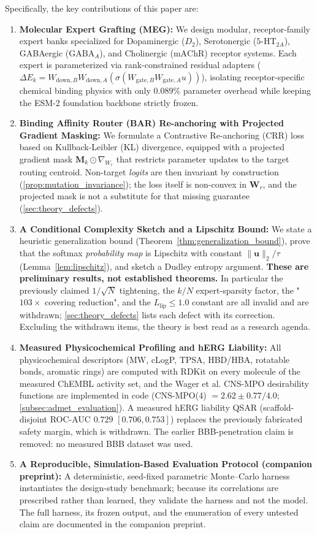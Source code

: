 \documentclass{article}
\theoremstyle{definition}
\begin{document}
Specifically, the key contributions of this paper are:
\begin{enumerate}[leftmargin=1.5em,noitemsep]
    \item \textbf{Molecular Expert Grafting (MEG):} We design modular, receptor-family expert banks specialized for Dopaminergic ($D_2$), Serotonergic ($5\text{-HT}_{2A}$), GABAergic ($\text{GABA}_A$), and Cholinergic ($\text{mAChR}$) receptor systems. Each expert is parameterized via rank-constrained residual adapters ($\Delta E_k = W_{\text{down}, B} W_{\text{down}, A} (\sigma(W_{\text{gate}, B} W_{\text{gate}, A} u))$), isolating receptor-specific chemical binding physics with only $0.089\%$ parameter overhead while keeping the ESM-2 foundation backbone strictly frozen.
    \item \textbf{Binding Affinity Router (BAR) Re-anchoring with Projected Gradient Masking:} We formulate a Contrastive Re-anchoring (CRR) loss based on Kullback-Leibler (KL) divergence, equipped with a projected gradient mask $\mathbf{M}_k \odot \nabla_{W_r}$ that restricts parameter updates to the target routing centroid. Non-target \emph{logits} are then invariant by construction (\cref{prop:mutation_invariance}); the loss itself is non-convex in $\mathbf{W}_r$, and the projected mask is not a substitute for that missing guarantee (\cref{sec:theory_defects}).
    \item \textbf{A Conditional Complexity Sketch and a Lipschitz Bound:} We state a heuristic generalization bound (Theorem~\ref{thm:generalization_bound}), prove that the softmax \emph{probability map} is Lipschitz with constant $\|\mathbf{u}\|_2/\tau$ (Lemma~\ref{lem:lipschitz}), and sketch a Dudley entropy argument. \textbf{These are preliminary results, not established theorems.} In particular the previously claimed $1/\sqrt{N}$ tightening, the $k/N$ expert-sparsity factor, the "$103\times$ covering reduction", and the $L_{\text{lip}} \le 1.0$ constant are all invalid and are withdrawn; \cref{sec:theory_defects} lists each defect with its correction. Excluding the withdrawn items, the theory is best read as a research agenda.
    \item \textbf{Measured Physicochemical Profiling and hERG Liability:} All physicochemical descriptors (MW, cLogP, TPSA, HBD/HBA, rotatable bonds, aromatic rings) are computed with RDKit on every molecule of the measured ChEMBL activity set, and the Wager et al. CNS-MPO desirability functions are implemented in code (CNS-MPO(4) $= 2.62 \pm 0.77 / 4.0$; \cref{subsec:admet_evaluation}). A measured hERG liability QSAR (scaffold-disjoint ROC-AUC $0.729$ $[0.706, 0.753]$) replaces the previously fabricated safety margin, which is withdrawn. The earlier BBB-penetration claim is removed: no measured BBB dataset was used.
    \item \textbf{A Reproducible, Simulation-Based Evaluation Protocol (companion preprint):} A deterministic, seed-fixed parametric Monte--Carlo harness instantiates the design-study benchmark; because its correlations are prescribed rather than learned, they validate the harness and not the model. The full harness, its frozen output, and the enumeration of every untested claim are documented in the companion preprint.
\end{enumerate}
\end{document}
